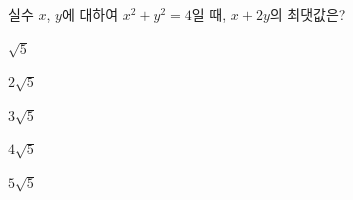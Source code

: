 실수 $x$, $y$에 대하여 $x^2+y^2=4$일 때, $x+2y$의 최댓값은?
\begin{choices32}{\rule[-3ex]{0pt}{8ex}$\sqrt{5}$}{\rule[-3ex]{0pt}{8ex}$2\sqrt{5}$}{\rule[-3ex]{0pt}{8ex}$3\sqrt{5}$}{\rule[-3ex]{0pt}{8ex}$4\sqrt{5}$}{\rule[-3ex]{0pt}{8ex}$5\sqrt{5}$}\end{choices32}
